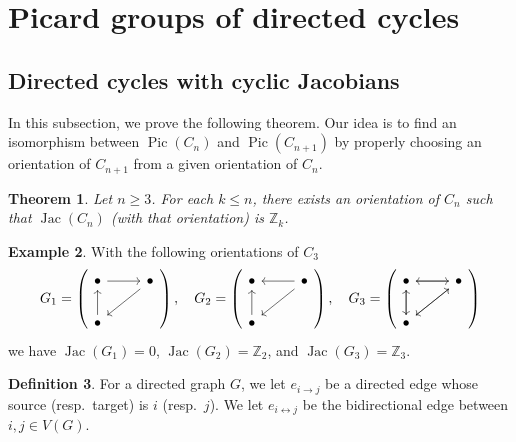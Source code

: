 \documentclass[11pt,reqno]{amsart}
\DeclareMathOperator{\Pic}{Pic}
\DeclareMathOperator{\Jac}{Jac}
\theoremstyle{definition}
\newtheorem{mydef}{Definition}[section]
\newtheorem{myeg}[mydef]{Example}
\theoremstyle{plain}
\newtheorem{mytheorem}[mydef]{Theorem}
\begin{document}
\section{Picard groups of directed cycles}\label{section: cycles}


\subsection{Directed cycles with cyclic Jacobians} 

In this subsection, we prove the following theorem. Our idea is to find an isomorphism between $\Pic(C_n)$ and $\Pic(C_{n+1})$ by properly choosing an orientation of $C_{n+1}$ from a given orientation of $C_n$. 

\begin{mytheorem}\label{theorem: single term}
Let $n \geq 3$. For each $k \leq n$, there exists an orientation of $C_n$ such that $\Jac(C_n)$ (with that orientation) is $\mathbb{Z}_k$.
\end{mytheorem}



\begin{myeg}\label{example: example c3}
With the following orientations of $C_3$
\[
G_1=\left(\begin{tikzcd}
\bullet \arrow[r] & \bullet \arrow[dl] \\
\bullet \arrow[u]& 
\end{tikzcd} \right), \quad G_2=\left(\begin{tikzcd}
\bullet  & \bullet \arrow[l]\arrow[dl] \\
\bullet \arrow[u]& 
\end{tikzcd} \right), \quad G_3=\left(\begin{tikzcd}
\bullet \arrow[r] \arrow[d]& \bullet \arrow[dl] \arrow[l]\\
\bullet \arrow[u] \arrow[ur]& 
\end{tikzcd} \right)
\]
we have $\Jac(G_1)=0$, $\Jac(G_2)=\mathbb{Z}_2$, and $\Jac(G_3)=\mathbb{Z}_3$. 
\end{myeg}

\begin{mydef}
For a directed graph $G$, we let $e_{i \to j}$ be a directed edge whose source (resp.~target) is $i$ (resp.~$j$). We let $e_{i \leftrightarrow j}$ be the bidirectional edge between $i,j \in V(G)$. 
\end{mydef}
\end{document}
